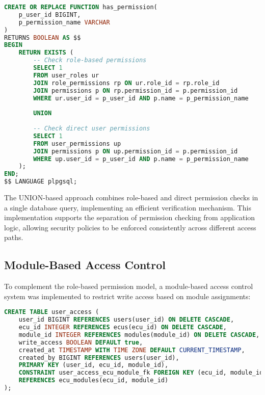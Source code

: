 \begin{lstlisting}[language=SQL, caption={Permission Check Implementation}, label={lst:permission-check}]
CREATE OR REPLACE FUNCTION has_permission(
    p_user_id BIGINT,
    p_permission_name VARCHAR
)
RETURNS BOOLEAN AS $$
BEGIN
    RETURN EXISTS (
        -- Check role-based permissions
        SELECT 1
        FROM user_roles ur
        JOIN role_permissions rp ON ur.role_id = rp.role_id
        JOIN permissions p ON rp.permission_id = p.permission_id
        WHERE ur.user_id = p_user_id AND p.name = p_permission_name
        
        UNION
        
        -- Check direct user permissions
        SELECT 1
        FROM user_permissions up
        JOIN permissions p ON up.permission_id = p.permission_id
        WHERE up.user_id = p_user_id AND p.name = p_permission_name
    );
END;
$$ LANGUAGE plpgsql;
\end{lstlisting}

The UNION-based approach combines role-based and direct permission checks in a single database query, implementing an efficient verification mechanism. This implementation supports the separation of permission checking from application logic, allowing security policies to be enforced consistently across different access paths.

\subsection{Module-Based Access Control}
\label{subsec:module-based-access-control}

To complement the role-based permission model, a module-based access control system was implemented to restrict write access based on module assignments:

\begin{lstlisting}[language=SQL, caption={Module Access Control Implementation}, label={lst:module-access}]
CREATE TABLE user_access (
    user_id BIGINT REFERENCES users(user_id) ON DELETE CASCADE,
    ecu_id INTEGER REFERENCES ecus(ecu_id) ON DELETE CASCADE,
    module_id INTEGER REFERENCES modules(module_id) ON DELETE CASCADE,
    write_access BOOLEAN DEFAULT true,
    created_at TIMESTAMP WITH TIME ZONE DEFAULT CURRENT_TIMESTAMP,
    created_by BIGINT REFERENCES users(user_id),
    PRIMARY KEY (user_id, ecu_id, module_id),
    CONSTRAINT user_access_ecu_module_fk FOREIGN KEY (ecu_id, module_id) 
    REFERENCES ecu_modules(ecu_id, module_id)
);
\end{lstlisting}


